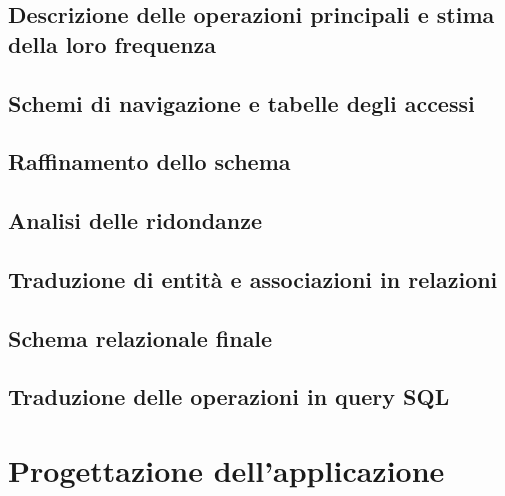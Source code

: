 \documentclass[a4paper,12pt]{report}
\begin{document}
\section{Descrizione delle operazioni principali e stima della loro frequenza}
\section{Schemi di navigazione e tabelle degli accessi}
\section{Raffinamento dello schema}
\section{Analisi delle ridondanze}
\section{Traduzione di entità e associazioni in relazioni}
\section{Schema relazionale finale}
\section{Traduzione delle operazioni in query SQL}
\newpage
\chapter{Progettazione dell'applicazione}
\end{document}
